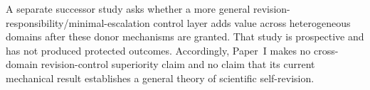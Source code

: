 A separate successor study asks whether a more general revision-responsibility/minimal-escalation control layer adds value across heterogeneous domains after these donor mechanisms are granted. That study is prospective and has not produced protected outcomes. Accordingly, Paper~I makes no cross-domain revision-control superiority claim and no claim that its current mechanical result establishes a general theory of scientific self-revision.
